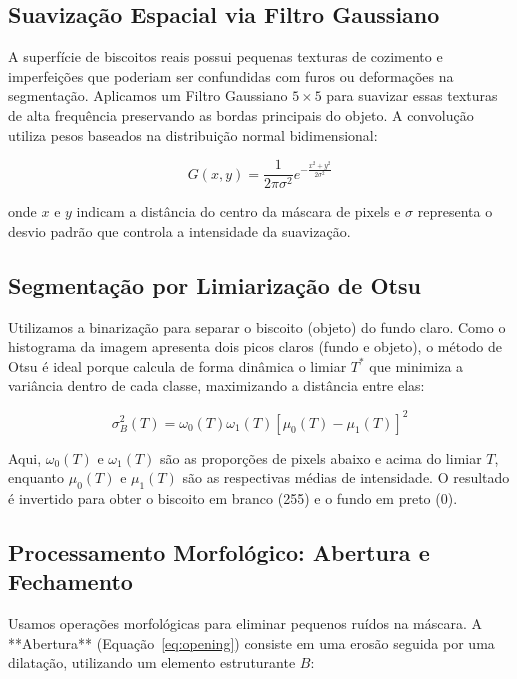 \documentclass[12pt]{article}
\begin{document}
\subsection{Suavização Espacial via Filtro Gaussiano}

A superfície de biscoitos reais possui pequenas texturas de cozimento e imperfeições que poderiam ser confundidas com furos ou deformações na segmentação. Aplicamos um Filtro Gaussiano $5 \times 5$ para suavizar essas texturas de alta frequência preservando as bordas principais do objeto. A convolução utiliza pesos baseados na distribuição normal bidimensional:

\begin{equation}
G(x, y) = \frac{1}{2\pi\sigma^2} e^{-\frac{x^2+y^2}{2\sigma^2}}
\label{eq:gaussian}
\end{equation}

onde $x$ e $y$ indicam a distância do centro da máscara de pixels e $\sigma$ representa o desvio padrão que controla a intensidade da suavização.

\subsection{Segmentação por Limiarização de Otsu}

Utilizamos a binarização para separar o biscoito (objeto) do fundo claro. Como o histograma da imagem apresenta dois picos claros (fundo e objeto), o método de Otsu é ideal porque calcula de forma dinâmica o limiar $T^*$ que minimiza a variância dentro de cada classe, maximizando a distância entre elas:

\begin{equation}
\sigma_B^2(T) = \omega_0(T)\omega_1(T) [\mu_0(T) - \mu_1(T)]^2
\label{eq:otsu}
\end{equation}

Aqui, $\omega_0(T)$ e $\omega_1(T)$ são as proporções de pixels abaixo e acima do limiar $T$, enquanto $\mu_0(T)$ e $\mu_1(T)$ são as respectivas médias de intensidade. O resultado é invertido para obter o biscoito em branco (255) e o fundo em preto (0).

\subsection{Processamento Morfológico: Abertura e Fechamento}

Usamos operações morfológicas para eliminar pequenos ruídos na máscara. A **Abertura** (Equação~\ref{eq:opening}) consiste em uma erosão seguida por uma dilatação, utilizando um elemento estruturante $B$:
\end{document}
